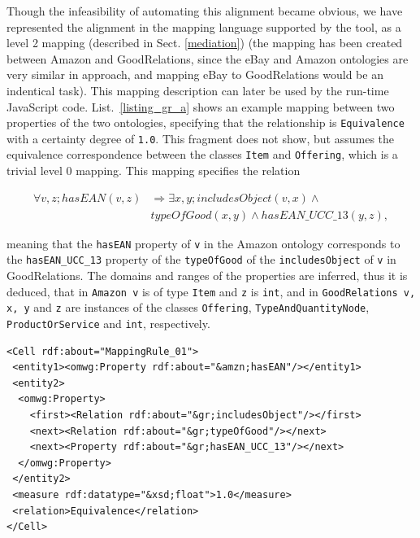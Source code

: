 Though the infeasibility of automating this alignment became obvious, we have represented the alignment in the mapping language supported by the tool, as a level 2 mapping (described in Sect. \ref{mediation}) (the mapping has been created between Amazon and GoodRelations, since the eBay and Amazon ontologies are very similar in approach, and mapping eBay to GoodRelations would be an indentical task). This mapping description can later be used by the run-time JavaScript code. List.~\ref{listing_gr_a} shows an example mapping between two properties of the two ontologies, specifying that the relationship is \texttt{Equivalence} with a certainty degree of \texttt{1.0}. This fragment does not show, but assumes the equivalence correspondence between the classes \texttt{Item} and \texttt{Offering}, which is a trivial level 0 mapping. This mapping specifies the relation

\begin{equation*} \label{eq}
\begin{split}
\forall{v,z}; hasEAN(v,z) & \Longrightarrow \exists{x, y}; includesObject(v,x) \wedge \\
&typeOfGood(x,y) \wedge hasEAN\_UCC\_13(y,z),
\end{split}
\end{equation*}

meaning that the \texttt{hasEAN} property of \texttt{v} in the Amazon ontology corresponds to the \texttt{hasEAN\_UCC\_13} property of the \texttt{typeOfGood} of the \texttt{includesObject} of \texttt{v} in GoodRelations. The domains and ranges of the properties are inferred, thus it is deduced, that in \texttt{Amazon v} is of type \texttt{Item} and \texttt{z} is \texttt{int}, and in \texttt{GoodRelations v, x, y} and \texttt{z} are instances of the classes \texttt{Offering}, \texttt{TypeAndQuantityNode}, \texttt{ProductOrService} and \texttt{int}, respectively.

\begin{center}
\lstset{frame=single, basicstyle=\small}
\lstset{caption=Fragment of the Amazon--GoodRelations mapping, label=listing_gr_a}
\lstset{language=bash}
\lstset{captionpos=b, breaklines=true}
\begin{lstlisting}
<Cell rdf:about="MappingRule_01">
 <entity1><omwg:Property rdf:about="&amzn;hasEAN"/></entity1>
 <entity2>
  <omwg:Property>
    <first><Relation rdf:about="&gr;includesObject"/></first>
    <next><Relation rdf:about="&gr;typeOfGood"/></next>
    <next><Property rdf:about="&gr;hasEAN_UCC_13"/></next>
  </omwg:Property>
 </entity2>
 <measure rdf:datatype="&xsd;float">1.0</measure>
 <relation>Equivalence</relation>
</Cell>
\end{lstlisting}
\end{center}

